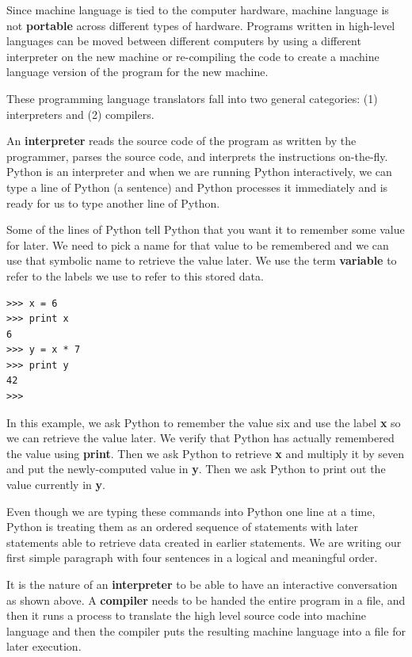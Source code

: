 \documentclass[11pt]{book}
\begin{document}
Since machine language is tied to the computer hardware, machine language
is not {\bf portable} across different types of hardware.  Programs written in 
high-level languages can be moved between different computers by using a 
different interpreter on the new machine or re-compiling the code to create
a machine language version of the program for the new machine.

These programming language translators fall into two general categories:
(1) interpreters and (2) compilers.

An {\bf interpreter} reads the source code of the program as written by the
programmer, parses the source code, and interprets the instructions on-the-fly.
Python is an interpreter and when we are running Python interactively, 
we can type a line of Python (a sentence) and Python processes it immediately
and is ready for us to type another line of Python.   

Some of the lines of Python tell Python that you want it to remember some 
value for later.   We need to pick a name for that value to be remembered and
we can use that symbolic name to retrieve the value later.  We use the 
term {\bf variable} to refer to the labels we use to refer to this stored data.

\beforeverb
\begin{verbatim}
>>> x = 6
>>> print x
6
>>> y = x * 7
>>> print y
42
>>> 
\end{verbatim}
\afterverb
%
In this example, we ask Python to remember the value six and use the label {\bf x}
so we can retrieve the value later.   We verify that Python has actually remembered
the value using {\bf print}. Then we ask Python to retrieve {\bf x} and multiply
it by seven and put the newly-computed value in {\bf y}.  Then we ask Python to print out
the value currently in {\bf y}.

Even though we are typing these commands into Python one line at a time, Python
is treating them as an ordered sequence of statements with later statements able
to retrieve data created in earlier statements.   We are writing our first 
simple paragraph with four sentences in a logical and meaningful order.

It is the nature of an {\bf interpreter} to be able to have an interactive conversation
as shown above.  A {\bf compiler} needs to be handed the entire program in a file, and then 
it runs a process to translate the high level source code into machine language
and then the compiler puts the resulting machine language into a file for later
execution.
\end{document}
